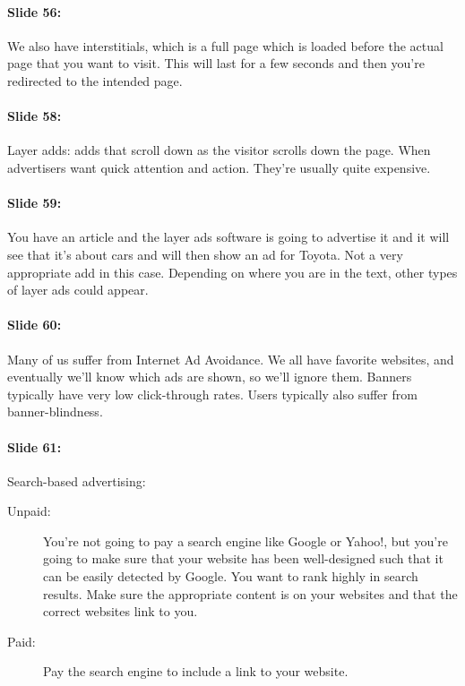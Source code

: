 \documentclass[10pt,a4paper]{report}
\begin{document}
\paragraph{Slide 56:}We also have interstitials, which is a full page which is loaded before the actual page that you want to visit. This will last for a few seconds and then you're redirected to the intended page.

\paragraph{Slide 58:}Layer adds: adds that scroll down as the visitor scrolls down the page. When advertisers want quick attention and action. They're usually quite expensive.

\paragraph{Slide 59:}You have an article and the layer ads software is going to advertise it and it will see that it's about cars and will then show an ad for Toyota. Not a very appropriate add in this case. Depending on where you are in the text, other types of layer ads could appear.

\paragraph{Slide 60:}Many of us suffer from Internet Ad Avoidance. We all have favorite websites, and eventually we'll know which ads are shown, so we'll ignore them. Banners typically have very low click-through rates. Users typically also suffer from banner-blindness.

\paragraph{Slide 61:}Search-based advertising:
\begin{description}
\item[Unpaid:]You're not going to pay a search engine like Google or Yahoo!, but you're going to make sure that your website has been well-designed such that it can be easily detected by Google. You want to rank highly in search results. Make sure the appropriate content is on your websites and that the correct websites link to you.
\item[Paid:]Pay the search engine to include a link to your website.
\end{description}	
	
\end{document}
